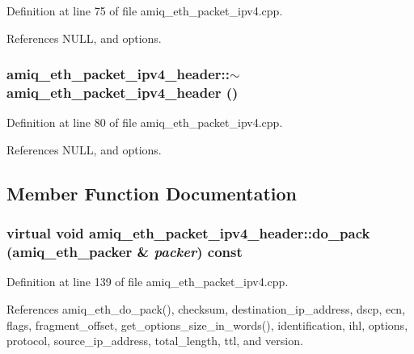 Definition at line 75 of file amiq\_\-eth\_\-packet\_\-ipv4.cpp.

References NULL, and options.\hypertarget{classamiq__eth__packet__ipv4__header_a6daae16cb693db34fe01bb601cb45bb1}{
\subsubsection[{$\sim$amiq\_\-eth\_\-packet\_\-ipv4\_\-header}]{\setlength{\rightskip}{0pt plus 5cm}amiq\_\-eth\_\-packet\_\-ipv4\_\-header::$\sim$amiq\_\-eth\_\-packet\_\-ipv4\_\-header ()}}
\label{classamiq__eth__packet__ipv4__header_a6daae16cb693db34fe01bb601cb45bb1}


Definition at line 80 of file amiq\_\-eth\_\-packet\_\-ipv4.cpp.

References NULL, and options.

\subsection{Member Function Documentation}
\hypertarget{classamiq__eth__packet__ipv4__header_a614be36fe34072ca8e260dd7ae7567ad}{
\subsubsection[{do\_\-pack}]{\setlength{\rightskip}{0pt plus 5cm}virtual void amiq\_\-eth\_\-packet\_\-ipv4\_\-header::do\_\-pack ({\bf amiq\_\-eth\_\-packer} \& {\em packer}) const}}
\label{classamiq__eth__packet__ipv4__header_a614be36fe34072ca8e260dd7ae7567ad}


Definition at line 139 of file amiq\_\-eth\_\-packet\_\-ipv4.cpp.

References amiq\_\-eth\_\-do\_\-pack(), checksum, destination\_\-ip\_\-address, dscp, ecn, flags, fragment\_\-offset, get\_\-options\_\-size\_\-in\_\-words(), identification, ihl, options, protocol, source\_\-ip\_\-address, total\_\-length, ttl, and version.

